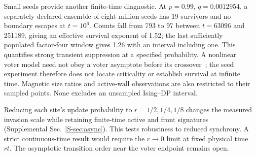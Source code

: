 Small seeds provide another finite-time diagnostic. At $p=0.99$,
$q=0.0012954$, a separately declared ensemble of eight million seeds
has 19 survivors and no boundary escapes at $t=10^6$. Counts fall from
793 to 97 between $t=63096$ and 251189, giving an effective survival
exponent of 1.52; the last sufficiently populated factor-four window
gives 1.26 with an interval including one. This quantifies strong
transient suppression at a specified probability.
A nonlinear voter model need not obey a voter asymptote before its
crossover~\cite{castellano2012,azizi2020}; the seed experiment therefore
does not locate criticality or establish survival at infinite time.
Magnetic size ratios and active-wall observations are also restricted
to their sampled points. None excludes an unsampled Ising--DP interval.

Reducing each site's update probability to $r=1/2,1/4,1/8$ changes
the measured invasion scale while retaining finite-time active and
front signatures (Supplemental Sec.~\ref{S-sec:async}). This tests
robustness to reduced synchrony. A strict continuous-time result would
require the $r\to0$ limit at fixed physical time $rt$.
The asymptotic transition order near the voter endpoint remains open.
